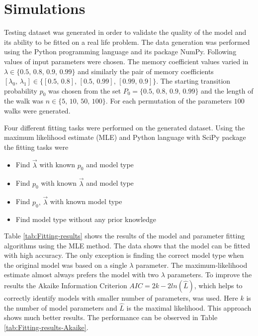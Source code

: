 \documentclass{amsart}
\theoremstyle{definition}
\theoremstyle{plain}
\theoremstyle{plain}
\theoremstyle{plain}
\numberwithin{equation}{section}
\begin{document}
\section{Simulations\label{sec:Simulations}}

Testing dataset was generated in order to validate the quality of
the model and its ability to be fitted on a real life problem. The
data generation was performed using the Python programming language
and its package NumPy. Following values of input parameters were chosen.
The memory coefficient values varied in $\lambda\in\{0.5,\,0.8,\,0.9,\,0.99\}$
and similarly the pair of memory coefficients $[\lambda_{0},\,\lambda_{1}]\in\{[0.5,\,0.8],\,[0.5,\,0.99],\,[0.99,\,0.9]\}$.
The starting transition probability $p_{0}$ was chosen from the set
$P_{0}=\{0.5,\,0.8,\,0.9,\,0.99\}$ and the length of the walk was
\textbf{$n\in\{5,\,10,\,50,\,100\}$}. For each permutation of the
parameters $100$ walks were generated.

Four different fitting tasks were performed on the generated dataset.
Using the maximum likelihood estimate (MLE) \cite{rossi2018mathematical}
and Python language with SciPy package the fitting tasks were

\begin{itemize}
\item Find $\overrightarrow{\lambda}$ with known $p_{0}$ and model type
\item Find $p_{0}$ with known $\overrightarrow{\lambda}$ and model type
\item Find $p_{0},\,\overrightarrow{\lambda}$ with known model type
\item Find model type without any prior knowledge
\end{itemize}

Table \ref{tab:Fitting-results} shows the results of the model and
parameter fitting algorithms using the MLE method. The data shows that
the model can be fitted with high accuracy. The only exception is
finding the correct model type when the original model was based on
a single $\lambda$ parameter. The maximum-likelihood estimate almost
always prefers the model with two $\lambda$ parameters. To improve
the results the Akaike Information Criterion $AIC=2k-2ln(\hat{L})$,
which helps to correctly identify models with smaller number of parameters,
was used. Here $k$ is the number of model parameters and $\hat{L}$
is the maximal likelihood. This approach shows much better results.
The performance can be observed in Table \ref{tab:Fitting-results-Akaike}.
\end{document}
